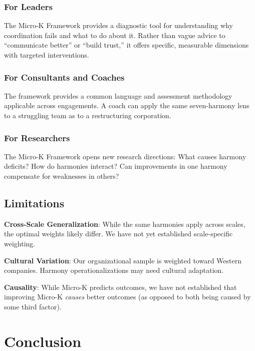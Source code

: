 \documentclass[12pt,a4paper]{article}
\begin{document}
\subsubsection{For Leaders}
The Micro-K Framework provides a diagnostic tool for understanding why coordination fails and what to do about it. Rather than vague advice to ``communicate better'' or ``build trust,'' it offers specific, measurable dimensions with targeted interventions.

\subsubsection{For Consultants and Coaches}
The framework provides a common language and assessment methodology applicable across engagements. A coach can apply the same seven-harmony lens to a struggling team as to a restructuring corporation.

\subsubsection{For Researchers}
The Micro-K Framework opens new research directions: What causes harmony deficits? How do harmonies interact? Can improvements in one harmony compensate for weaknesses in others?

\subsection{Limitations}

\textbf{Cross-Scale Generalization}: While the same harmonies apply across scales, the optimal weights likely differ. We have not yet established scale-specific weighting.

\textbf{Cultural Variation}: Our organizational sample is weighted toward Western companies. Harmony operationalizations may need cultural adaptation.

\textbf{Causality}: While Micro-K predicts outcomes, we have not established that improving Micro-K \textit{causes} better outcomes (as opposed to both being caused by some third factor).

\section{Conclusion}
\label{sec:conclusion}
\end{document}
